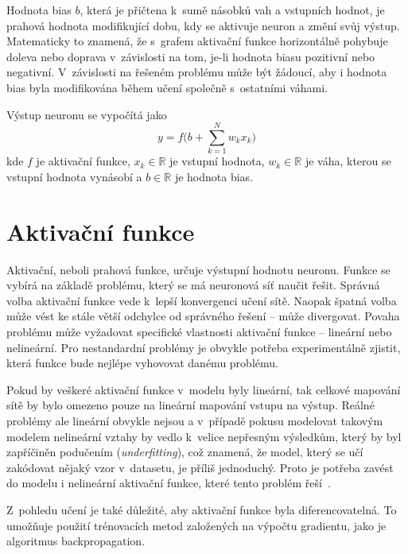 Hodnota bias $b$, která je přičtena k~sumě násobků vah a vstupních hodnot, je prahová hodnota modifikující dobu, kdy se aktivuje neuron a změní svůj výstup. Matematicky to znamená, že s~grafem aktivační funkce horizontálně pohybuje doleva nebo doprava v~závislosti na tom, je-li hodnota biasu pozitivní nebo negativní. V~závislosti na řešeném problému může být žádoucí, aby i hodnota bias byla modifikována během učení společně s~ostatními váhami.



Výstup neuronu se vypočítá jako
\begin{equation}
	y = f\Big(b + \sum_{k=1}^N w_kx_k \Big)
\end{equation}
kde $f$ je aktivační funkce, $x_k \in \mathbb{R}$ je vstupní hodnota, $w_k \in \mathbb{R}$ je váha, kterou se vstupní hodnota vynásobí a $b \in \mathbb{R}$ je hodnota bias.


\section{Aktivační funkce}
Aktivační, neboli prahová funkce, určuje výstupní hodnotu neuronu. Funkce se vybírá na základě problému, který se má neuronová síť naučit řešit. Správná volba aktivační funkce vede k~lepší konvergenci učení sítě. Naopak špatná volba může vést ke stále větší odchylce od správného řešení -- může divergovat. Povaha problému může vyžadovat specifické vlastnosti aktivační funkce -- lineární nebo nelineární. Pro nestandardní problémy je obvykle potřeba experimentálně zjistit, která funkce bude nejlépe vyhovovat danému problému. 

Pokud by veškeré aktivační funkce v~modelu byly lineární, tak celkové mapování sítě by bylo omezeno pouze na lineární mapování vstupu na výstup. Reálné problémy ale lineární obvykle nejsou a v~případě pokusu modelovat takovým modelem nelineární vztahy by vedlo k~velice nepřesným výsledkům, který by byl zapříčiněn podučením (\textit{underfitting}), což znamená, že model, který se učí zakódovat nějaký vzor v~datasetu, je příliš jednoduchý. Proto je potřeba zavést do modelu i nelineární aktivační funkce, které tento problém řeší~\cite{mitdeeplearning_small}.

Z~pohledu učení je také důležité, aby aktivační funkce byla diferencovatelná. To umožňuje použití trénovacích metod založených na výpočtu gradientu, jako je algoritmus backpropagation.




